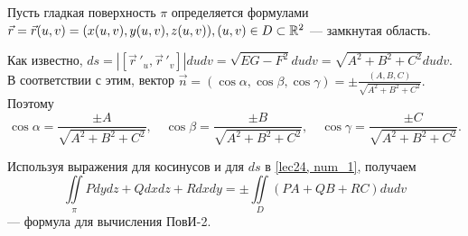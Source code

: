 \documentclass[../../main.tex]{subfiles}
\begin{document}
Пусть гладкая поверхность $\pi$ определяется формулами $\vec{r} = \vec{r}(u,v) =
 (x(u,v), y(u,v), z(u,v)), (u, v)\in D\subset \mathbb{R}^2$ --- замкнутая область.

Как известно, $ds = \left|\left[ \vec r\,'_u,  \vec r\,'_v\right]\right|dudv = 
\sqrt{EG - F^2} dudv = \sqrt{A^2 + B^2 + C^2}dudv.$ В соответствии с этим, вектор
 $\vec{n} = (\cos\alpha, \cos\beta, \cos\gamma) = \pm\frac{(A, B, C)}{\sqrt{A^2
 		 + B^2 + C^2}}.$ Поэтому \[\cos\alpha = \frac{\pm A}{\sqrt{A^2 + B^2 + 
 		 C^2}},\quad \cos\beta = \frac{\pm B}{\sqrt{A^2 + B^2 + C^2}},\quad 
 	 \cos\gamma = \frac{\pm C}{\sqrt{A^2 + B^2 + C^2}}.\]

Используя выражения для косинусов и для $ds$ в \eqref{lec24, num_1}, получаем
\begin{equation}\label{lec24, num_2}
\iint\limits_\pi Pdydz + Qdxdz + Rdxdy = \pm \iint\limits_D(PA + QB + RC)dudv
\end{equation}
--- формула для вычисления ПовИ-2.
\end{document}
